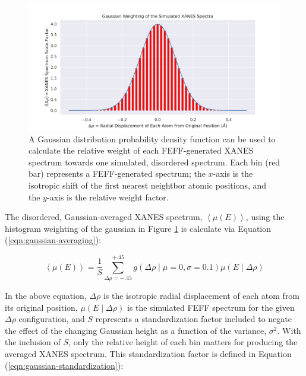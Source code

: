 \begin{figure}[h!]
	\centering
	\includegraphics[width=\linewidth]{Chapters/Figures/gaussian-weighting-hist.png}
	\caption[Simulated Spectrum Gaussian Weighting]{A Gaussian distribution probability density function can be used to calculate the relative weight of each FEFF-generated XANES spectrum towards one simulated, disordered spectrum. Each bin (red bar) represents a FEFF-generated spectrum; the $x$-axis is the isotropic shift of the first nearest neightbor atomic positions, and the $y$-axis is the relative weight factor.}
	\label{fig:gaussian-weighting-hist}
\end{figure}

The disordered, Gaussian-averaged XANES spectrum, $ \left\langle \mu(E) \right\rangle $, using the histogram weighting of the gaussian in Figure \ref{fig:gaussian-weighting-hist} is calculate via Equation (\ref{eqn:gaussian-averaging}):

\begin{equation}
	\label{eqn:gaussian-averaging}
	\left\langle \mu(E) \right\rangle  = \frac{1}{S} \sum_{\Delta\rho=-.45}^{+.45} g\left(\Delta \rho \mid \mu=0, \sigma=0.1\right) \mu(E \mid \Delta\rho)
\end{equation}

\noindent
In the above equation, $ \Delta\rho $ is the isotropic radial displacement of each atom from its original position, $\mu(E \mid \Delta\rho) $ is the simulated FEFF spectrum for the given $ \Delta\rho $ configuration, and $ S $ represents a standardization factor included to negate the effect of the changing Gaussian height as a function of the variance, $ \sigma^2 $. With the inclusion of $ S $, only the relative height of each bin matters for producing the averaged XANES spectrum. This standardization factor is defined in Equation (\ref{eqn:gaussian-standardization}):

